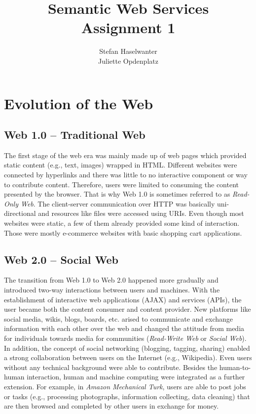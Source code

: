 \documentclass[a4paper]{article}
\title{\textbf{Semantic Web Services}\\\large{Assignment 1}}
\author{Stefan Haselwanter\\Juliette Opdenplatz}
\begin{document}
\maketitle


\section{Evolution of the Web}

\subsection*{Web 1.0 -- Traditional Web}
The first stage of the web era was mainly made up of web pages which provided static content (e.g., text, images) wrapped in HTML.
Different websites were connected by hyperlinks and there was little to no interactive component or way to contribute content.
Therefore, users were limited to consuming the content presented by the browser.
That is why Web 1.0 is sometimes referred to as \emph{Read-Only Web}.
The client-server communication over HTTP was basically uni-directional and resources like files were accessed using URIs.
Even though most websites were static, a few of them already provided some kind of interaction.
Those were mostly e-commerce websites with basic shopping cart applications.

\subsection*{Web 2.0 -- Social Web}
The transition from Web 1.0 to Web 2.0 happened more gradually and introduced two-way interactions between users and machines.
With the establishment of interactive web applications (AJAX) and services (APIs), the user became both the content consumer and content provider.
New platforms like social media, wikis, blogs, boards, etc. arised to communicate and exchange information with each other over the web and changed the attitude from media for individuals towards media for communities (\emph{Read-Write Web} or \emph{Social Web}).
In addition, the concept of social networking (blogging, tagging, sharing) enabled a strong collaboration between users on the Internet (e.g., Wikipedia).
Even users without any technical background were able to contribute.
Besides the human-to-human interaction, human and machine computing were integrated as a further extension.
For example, in \emph{Amazon Mechanical Turk}, users are able to post jobs or tasks (e.g., processing photographs, information collecting, data cleaning) that are then browsed and completed by other users in exchange for money.
\end{document}
